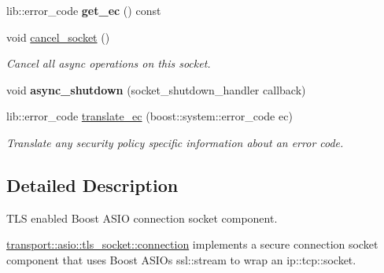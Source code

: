 \begin{DoxyCompactItemize}
\item 
lib\+::error\+\_\+code {\bfseries get\+\_\+ec} () const\hypertarget{classwebsocketpp_1_1transport_1_1asio_1_1tls__socket_1_1connection_aa62d8c4c31652f674bed127e542ffc4f}{}\label{classwebsocketpp_1_1transport_1_1asio_1_1tls__socket_1_1connection_aa62d8c4c31652f674bed127e542ffc4f}

\item 
void \hyperlink{classwebsocketpp_1_1transport_1_1asio_1_1tls__socket_1_1connection_aaac444cdcfc7f74810844566fd624233}{cancel\+\_\+socket} ()\hypertarget{classwebsocketpp_1_1transport_1_1asio_1_1tls__socket_1_1connection_aaac444cdcfc7f74810844566fd624233}{}\label{classwebsocketpp_1_1transport_1_1asio_1_1tls__socket_1_1connection_aaac444cdcfc7f74810844566fd624233}

\begin{DoxyCompactList}\small\item\em Cancel all async operations on this socket. \end{DoxyCompactList}\item 
void {\bfseries async\+\_\+shutdown} (socket\+\_\+shutdown\+\_\+handler callback)\hypertarget{classwebsocketpp_1_1transport_1_1asio_1_1tls__socket_1_1connection_abbdeca46d1363a4f57a5d19e8bddaac3}{}\label{classwebsocketpp_1_1transport_1_1asio_1_1tls__socket_1_1connection_abbdeca46d1363a4f57a5d19e8bddaac3}

\item 
lib\+::error\+\_\+code \hyperlink{classwebsocketpp_1_1transport_1_1asio_1_1tls__socket_1_1connection_a52b9b98a0d6b39131ba1c5ae6781f5ca}{translate\+\_\+ec} (boost\+::system\+::error\+\_\+code ec)
\begin{DoxyCompactList}\small\item\em Translate any security policy specific information about an error code. \end{DoxyCompactList}\end{DoxyCompactItemize}


\subsection{Detailed Description}
T\+LS enabled Boost A\+S\+IO connection socket component. 

\hyperlink{classwebsocketpp_1_1transport_1_1asio_1_1tls__socket_1_1connection}{transport\+::asio\+::tls\+\_\+socket\+::connection} implements a secure connection socket component that uses Boost A\+S\+IO\textquotesingle{}s ssl\+::stream to wrap an ip\+::tcp\+::socket. 

